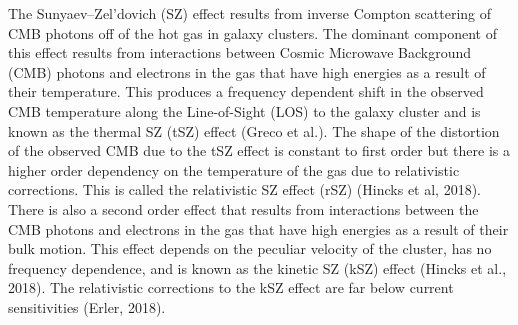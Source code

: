 \documentclass{princeton_astro_thesis}
\begin{document}
\par The Sunyaev--Zel'dovich (SZ) effect results from inverse Compton scattering of CMB photons off of the hot gas in galaxy clusters. The dominant component of this effect results from interactions between Cosmic Microwave Background (CMB) photons and electrons in the gas that have high energies as a result of their temperature. This produces a frequency dependent shift in the observed CMB temperature along the Line-of-Sight (LOS) to the galaxy cluster and is known as the thermal SZ (tSZ) effect (Greco et al.). The shape of the distortion of the observed CMB due to the tSZ effect is constant to first order but there is a higher order dependency on the temperature of the gas due to relativistic corrections. This is called the relativistic SZ effect (rSZ) (Hincks et al, 2018). There is also a second order effect that results from interactions between the CMB photons and electrons in the gas that have high energies as a result of their bulk motion. This effect depends on the peculiar velocity of the cluster, has no frequency dependence, and is known as the kinetic SZ (kSZ) effect (Hincks et al., 2018). The relativistic corrections to the kSZ effect are far below current sensitivities (Erler, 2018). 
\end{document}
